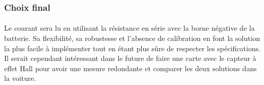 	\subsubsection*{Choix final}
	\paragraph*{}
	Le courant sera lu en utilisant la résistance en série avec la borne négative de la batterie. Sa flexibilité, sa robustesse et l'absence de calibration en font la solution la plus facile à implémenter tout en étant plus sûre de respecter les spécifications. Il serait cependant intéressant dans le future de faire une carte avec le capteur à effet Hall pour avoir une mesure redondante et comparer les deux solutions dans la voiture.	
		